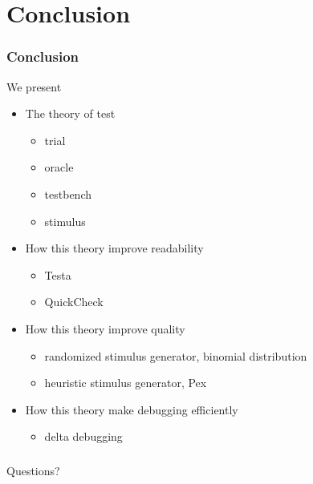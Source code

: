 \documentclass[lualatex]{beamer}
\begin{document}
\section{Conclusion}

\begin{frame}
  \frametitle{Conclusion}

  \begin{block}{We present}
    \begin{itemize}
    \item The theory of test
      \begin{itemize}
      \item trial
      \item oracle
      \item testbench
      \item stimulus
      \end{itemize}
      \pause
    \item How this theory improve readability
      \begin{itemize}
      \item Testa
      \item QuickCheck
      \end{itemize}
      \pause
    \item How this theory improve quality
      \begin{itemize}
      \item randomized stimulus generator, binomial distribution
      \item heuristic stimulus generator, Pex
      \end{itemize}
      \pause
    \item How this theory make debugging efficiently
      \begin{itemize}
      \item delta debugging
      \end{itemize}
    \end{itemize}
  \end{block}
\end{frame}

\begin{frame}
  \frametitle{}
  \begin{center}
    \Huge
    Questions?
  \end{center}
\end{frame}
\end{document}
